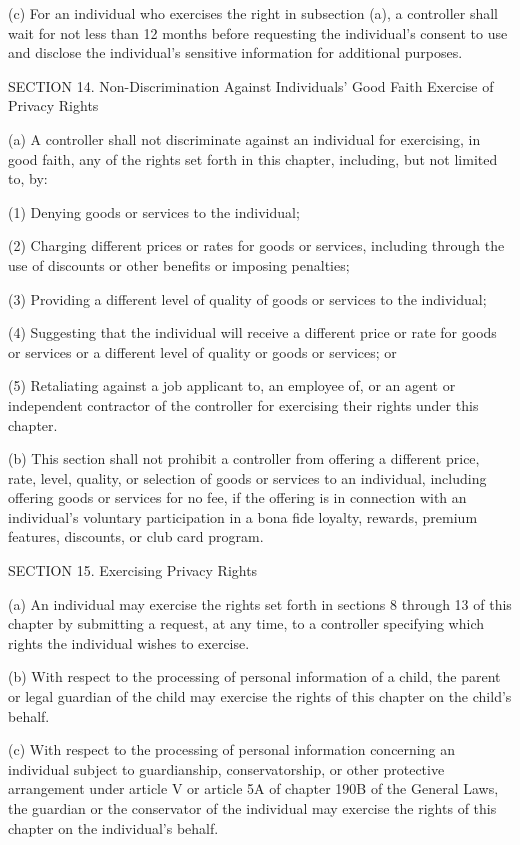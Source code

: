 (c) For an individual who exercises the right in subsection (a), a controller shall wait for not less than 12 months before requesting the individual’s consent to use and disclose the individual’s sensitive information for additional purposes.

SECTION 14. Non-Discrimination Against Individuals’ Good Faith Exercise of Privacy Rights

(a) A controller shall not discriminate against an individual for exercising, in good faith, any of the rights set forth in this chapter, including, but not limited to, by:

(1) Denying goods or services to the individual;

(2) Charging different prices or rates for goods or services, including through the use of discounts or other benefits or imposing penalties;

(3) Providing a different level of quality of goods or services to the individual;

(4) Suggesting that the individual will receive a different price or rate for goods or services or a different level of quality or goods or services; or

(5) Retaliating against a job applicant to, an employee of, or an agent or independent contractor of the controller for exercising their rights under this chapter. 

(b) This section shall not prohibit a controller from offering a different price, rate, level, quality, or selection of goods or services to an individual, including offering goods or services for no fee, if the offering is in connection with an individual’s voluntary participation in a bona fide loyalty, rewards, premium features, discounts, or club card program.

SECTION 15. Exercising Privacy Rights

(a) An individual may exercise the rights set forth in sections 8 through 13 of this chapter by submitting a request, at any time, to a controller specifying which rights the individual wishes to exercise.

(b) With respect to the processing of personal information of a child, the parent or legal guardian of the child may exercise the rights of this chapter on the child’s behalf.

(c) With respect to the processing of personal information concerning an individual subject to guardianship, conservatorship, or other protective arrangement under article V or article 5A of chapter 190B of the General Laws, the guardian or the conservator of the individual may exercise the rights of this chapter on the individual’s behalf.

